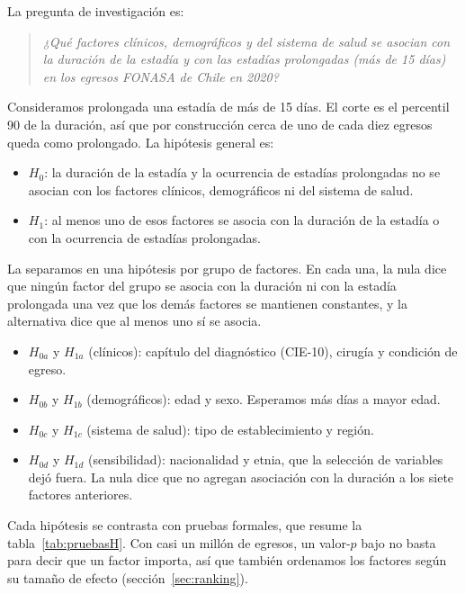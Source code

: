 \documentclass[10.5pt,a4paper,headings=small,abstract=false,bibliography=totoc,listof=totoc]{scrartcl}
\newcommand{\cie}{\mbox{CIE-10}}
\begin{document}
La pregunta de investigación es:

\begin{quote}
\emph{¿Qué factores clínicos, demográficos y del sistema de salud se asocian con la duración de la estadía y con las estadías prolongadas (más de 15 días) en los egresos FONASA de Chile en 2020?}
\end{quote}

Consideramos prolongada una estadía de más de 15 días. El corte es el percentil 90 de la duración, así que por construcción cerca de uno de cada diez egresos queda como prolongado. La hipótesis general es:

\begin{itemize}\setlength\itemsep{0pt}
\item $H_0$: la duración de la estadía y la ocurrencia de estadías prolongadas no se asocian con los factores clínicos, demográficos ni del sistema de salud.
\item $H_1$: al menos uno de esos factores se asocia con la duración de la estadía o con la ocurrencia de estadías prolongadas.
\end{itemize}

La separamos en una hipótesis por grupo de factores. En cada una, la nula dice que ningún factor del grupo se asocia con la duración ni con la estadía prolongada una vez que los demás factores se mantienen constantes, y la alternativa dice que al menos uno sí se asocia.

\begin{itemize}\setlength\itemsep{0pt}
\item $H_{0a}$ y $H_{1a}$ (clínicos): capítulo del diagnóstico (\cie), cirugía y condición de egreso.
\item $H_{0b}$ y $H_{1b}$ (demográficos): edad y sexo. Esperamos más días a mayor edad.
\item $H_{0c}$ y $H_{1c}$ (sistema de salud): tipo de establecimiento y región.
\item $H_{0d}$ y $H_{1d}$ (sensibilidad): nacionalidad y etnia, que la selección de variables dejó fuera. La nula dice que no agregan asociación con la duración a los siete factores anteriores.
\end{itemize}

Cada hipótesis se contrasta con pruebas formales, que resume la tabla~\ref{tab:pruebasH}. Con casi un millón de egresos, un valor-$p$ bajo no basta para decir que un factor importa, así que también ordenamos los factores según su tamaño de efecto (sección~\ref{sec:ranking}).
\end{document}

